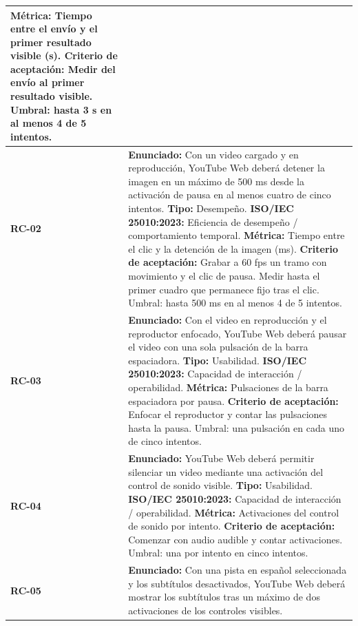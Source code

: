 \documentclass[11pt,a4paper]{article}
\begin{document}
\begin{longtable}{|p{}|p{}|}
\textbf{Métrica:} Tiempo entre el envío y el primer resultado visible (s).\newline
\textbf{Criterio de aceptación:} Medir del envío al primer resultado visible. Umbral: hasta 3 s en al menos 4 de 5 intentos. \\ \hline
\textbf{RC-02} & \textbf{Enunciado:} Con un video cargado y en reproducción, YouTube Web deberá detener la imagen en un máximo de 500 ms desde la activación de pausa en al menos cuatro de cinco intentos.\newline
\textbf{Tipo:} Desempeño.\newline
\textbf{ISO/IEC 25010:2023:} Eficiencia de desempeño / comportamiento temporal.\newline
\textbf{Métrica:} Tiempo entre el clic y la detención de la imagen (ms).\newline
\textbf{Criterio de aceptación:} Grabar a 60 fps un tramo con movimiento y el clic de pausa. Medir hasta el primer cuadro que permanece fijo tras el clic. Umbral: hasta 500 ms en al menos 4 de 5 intentos. \\ \hline
\textbf{RC-03} & \textbf{Enunciado:} Con el video en reproducción y el reproductor enfocado, YouTube Web deberá pausar el video con una sola pulsación de la barra espaciadora.\newline
\textbf{Tipo:} Usabilidad.\newline
\textbf{ISO/IEC 25010:2023:} Capacidad de interacción / operabilidad.\newline
\textbf{Métrica:} Pulsaciones de la barra espaciadora por pausa.\newline
\textbf{Criterio de aceptación:} Enfocar el reproductor y contar las pulsaciones hasta la pausa. Umbral: una pulsación en cada uno de cinco intentos. \\ \hline
\textbf{RC-04} & \textbf{Enunciado:} YouTube Web deberá permitir silenciar un video mediante una activación del control de sonido visible.\newline
\textbf{Tipo:} Usabilidad.\newline
\textbf{ISO/IEC 25010:2023:} Capacidad de interacción / operabilidad.\newline
\textbf{Métrica:} Activaciones del control de sonido por intento.\newline
\textbf{Criterio de aceptación:} Comenzar con audio audible y contar activaciones. Umbral: una por intento en cinco intentos. \\ \hline
\textbf{RC-05} & \textbf{Enunciado:} Con una pista en español seleccionada y los subtítulos desactivados, YouTube Web deberá mostrar los subtítulos tras un máximo de dos activaciones de los controles visibles.\newline

\end{longtable}
\end{document}
